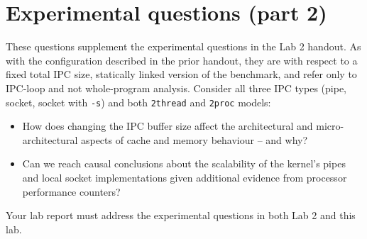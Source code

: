 \documentclass[a4paper,10pt]{article}
\begin{document}
\section*{Experimental questions (part 2)}

These questions supplement the experimental questions in the Lab 2 handout.
As with the configuration described in the prior handout, they are with
respect to a fixed total IPC size, statically linked version of the benchmark,
and refer only to IPC-loop and not whole-program analysis.
Consider all three IPC types (pipe, socket, socket with \texttt{-s}) and both
\texttt{2thread} and \texttt{2proc} models:

\begin{itemize}
  \item How does changing the IPC buffer size affect the architectural and
    micro-architectural aspects of cache and memory behaviour -- and why?
  \item Can we reach causal conclusions about the scalability of the kernel's
    pipes and local socket implementations given additional evidence from
    processor performance counters?
\end{itemize}

\noindent
Your lab report must address the experimental questions in both Lab 2 and this
lab.
\end{document}
